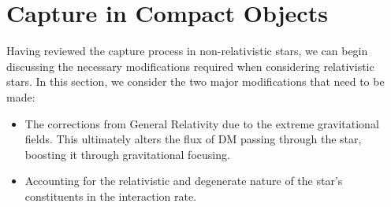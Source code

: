 

\section{Capture in Compact Objects}

Having reviewed the capture process in non-relativistic stars, we can begin discussing the necessary modifications required when considering relativistic stars. In this section, we consider the two major modifications that need to be made: 
\begin{itemize}
    \item The corrections from General Relativity due to the extreme gravitational fields. This ultimately alters the flux of DM passing through the star, boosting it through gravitational focusing.
    \item Accounting for the relativistic and degenerate nature of the star's constituents in the interaction rate.
\end{itemize}


